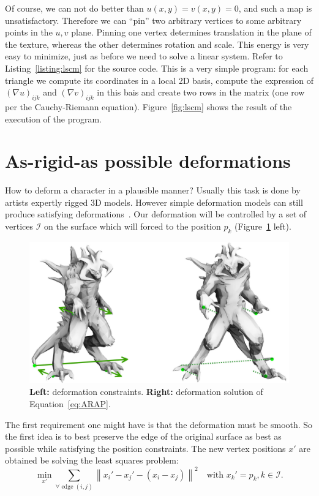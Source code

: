 \documentclass[notitlepage,oneside]{book}
\begin{document}
Of course, we can not do better than $u(x,y)=v(x,y)=0$, and such a map is unsatisfactory. Therefore we can ``pin'' two arbitrary vertices to some arbitrary points in the $u,v$ plane.
Pinning one vertex determines translation in the plane of the texture, whereas the other determines rotation and scale.
This energy is very easy to minimize, just as before we need to solve a linear system.
Refer to Listing~\ref{listing:lscm} for the source code.
This is a very simple program: for each triangle we compute its coordinates in a local 2D basis, compute the expression of $(\nabla u)_{ijk}$ and $(\nabla v)_{ijk}$ in this bais
and create two rows in the matrix (one row per the Cauchy-Riemann equation).
Figure~\ref{fig:lscm} shows the result of the execution of the program.


\section{As-rigid-as possible deformations}
\label{sec:arap}
How to deform a character in a plausible manner?
Usually this task is done by artists expertly rigged 3D models.
However simple deformation models can still produce satisfying deformations~\cite{ARAP_modeling:2007}.
Our deformation will be controlled by a set of vertices $\mathcal{I}$ on the surface which will forced to the position $p_k$ (Figure~\ref{fig:ARAP} left).

\begin{figure}[!h]
 \centering
 \includegraphics[width=\linewidth]{img/ARAP.jpg}
 \caption{\textbf{Left:} deformation constraints. \textbf{Right:} deformation solution of Equation~\eqref{eq:ARAP}.}
 \label{fig:ARAP}
\end{figure}

The first requirement one might have is that the deformation must be smooth. So the first idea is to best preserve the edge of the original surface as best as possible while satisfying the position constraints. The new vertex positions $x'$ are obtained be solving the least squares problem:
\begin{equation}
 \min_{x'} \sum_{\forall \text{ edge } (i,j)} \left\| x_i' - x_j'- (x_i - x_j) \right\|^2 \quad \text{with } x_k' = p_k , k \in \mathcal{I} .
\label{eq:ARAP_lap}
\end{equation}
\end{document}
